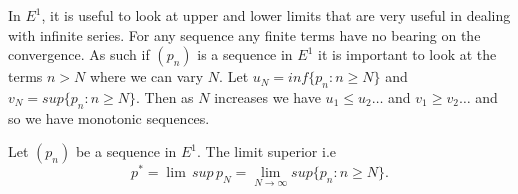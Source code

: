 In $E^1$, it is useful to look at upper and lower limits that are very useful in dealing with
infinite series. For any sequence any finite terms have no bearing on the convergence. As such if
$(p_n)$ is a sequence in $E^1$ it is important to look at the terms $n > N$ where we can vary $N$. 
Let $u_N = inf\lbrace p_n : n \geq N\rbrace$ and $v_N = sup \lbrace p_n : n \geq N \rbrace$. Then as
$N$ increases we have $u_1 \leq u_2 \ldots$ and $v_1 \geq v_2 \ldots$ and so we have monotonic
sequences. 

\begin{Definition}
    Let $(p_n)$ be a sequence in $E^1$. The limit superior i.e
    \begin{equation*}
	p^{*} = \lim \, sup \, p_N =
	\lim_{N\to\infty}sup\lbrace p_n : n\geq N \rbrace.
    \end{equation*}
\end{Definition}

